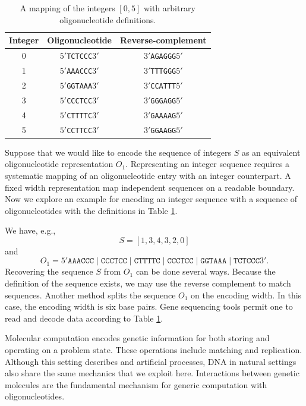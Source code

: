 \begin{table}[htdp]
\caption{A mapping of the integers $[0,5]$ with arbitrary oligonucleotide definitions.}
\begin{center}
\begin{tabular}{|c|c|c|}
\hline
 \textbf{Integer} & \textbf{Oligonucleotide} & \textbf{Reverse-complement}\\ \hline
0 & $5'$\texttt{TCTCCC}$3'$ & $3'$\texttt{AGAGGG}$5'$ \\
1 & $5'$\texttt{AAACCC}$3'$ & $3'$\texttt{TTTGGG}$5'$ \\
2 & $5'$\texttt{GGTAAA}$3'$ & $3'$\texttt{CCATTT}$5'$ \\
3 & $5'$\texttt{CCCTCC}$3'$ & $3'$\texttt{GGGAGG}$5'$ \\
4 & $5'$\texttt{CTTTTC}$3'$ & $3'$\texttt{GAAAAG}$5'$ \\
5 & $5'$\texttt{CCTTCC}$3'$ & $3'$\texttt{GGAAGG}$5'$ \\ \hline
\end{tabular}
\end{center}
\label{integer2OligoTable}
\end{table}%

Suppose that we would like to encode the sequence of integers $S$ as an equivalent oligonucleotide representation $O_1$.  Representing an integer sequence requires a systematic mapping of an oligonucleotide entry with an integer counterpart.  A fixed width representation map independent sequences on a readable boundary.  Now we explore an example for encoding an integer sequence with a sequence of oligonucleotides with the definitions in Table \ref{integer2OligoTable}.

We have, e.g., 
\[
S = [1, 3, 4, 3, 2, 0]
\]
and 
\[
O_1 = 5'\texttt{AAACCC}\mid \texttt{CCCTCC}\mid \texttt{CTTTTC}\mid \texttt{CCCTCC}\mid \texttt{GGTAAA}\mid \texttt{TCTCCC}3'.
\]
Recovering the sequence $S$ from $O_1$ can be done several ways.  Because the definition of the sequence exists, we may use the reverse complement to match sequences.  Another method splits the sequence $O_1$ on the encoding width.  In this case, the encoding width is six base pairs.  Gene sequencing tools permit one to read and decode data according to Table \ref{integer2OligoTable}.

Molecular computation encodes genetic information for both storing and operating on a problem state.  These operations include matching and replication.  Although this setting describes and artificial processes, DNA in natural settings also share the same mechanics that we exploit here.  Interactions between genetic molecules are the fundamental mechanism for generic computation with oligonucleotides.
	
